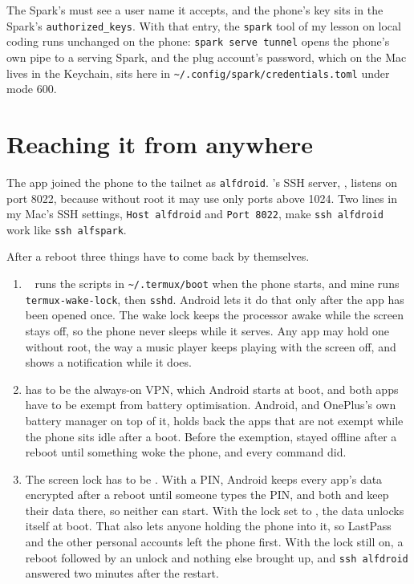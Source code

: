 \documentclass[11pt,a4paper]{article}
\begin{document}
The Spark's  must see a user name it accepts, and the phone's key sits in the Spark's \texttt{authorized\_keys}. With that entry, the \texttt{spark} tool of my lesson on local coding runs unchanged on the phone: \texttt{spark serve tunnel} opens the phone's own pipe to a serving Spark, and the plug account's password, which on the Mac lives in the Keychain, sits here in \texttt{\textasciitilde/.config/spark/credentials.toml} under mode 600.

\section*{Reaching it from anywhere}

 The  app joined the phone to the tailnet as \texttt{alfdroid}. 's SSH server, , listens on port 8022, because without root it may use only ports above 1024. Two lines in my Mac's SSH settings, \texttt{Host alfdroid} and \texttt{Port 8022}, make \texttt{ssh alfdroid} work like \texttt{ssh alfspark}.

After a reboot three things have to come back by themselves.
\begin{enumerate}[leftmargin=2em,itemsep=1pt]
\item {}~\cite{boot} runs the scripts in \texttt{\textasciitilde/.termux/boot} when the phone starts, and mine runs \texttt{termux-wake-lock}, then \texttt{sshd}. Android lets it do that only after the app has been opened once. The wake lock keeps the processor awake while the screen stays off, so the phone never sleeps while it serves. Any app may hold one without root, the way a music player keeps playing with the screen off, and  shows a notification while it does.
\item {} has to be the always-on VPN, which Android starts at boot, and both apps have to be exempt from battery optimisation. Android, and OnePlus's own battery manager on top of it, holds back the apps that are not exempt while the phone sits idle after a boot. Before the exemption,  stayed offline after a reboot until something woke the phone, and every  command did.
\item The screen lock has to be . With a PIN, Android keeps every app's data encrypted after a reboot until someone types the PIN, and both  and  keep their data there, so neither can start. With the lock set to , the data unlocks itself at boot. That also lets anyone holding the phone into it, so LastPass and the other personal accounts left the phone first. With the lock still on, a reboot followed by an unlock and nothing else brought  up, and \texttt{ssh alfdroid} answered two minutes after the restart.
\end{enumerate}
\end{document}
